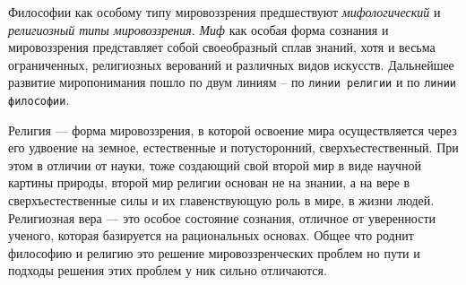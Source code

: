 \documentclass[12pt]{article}
\begin{document}
Философии как особому типу мировоззрения предшествуют \textit{мифологический} и \textit{религиозный типы мировоззрения}.
\textit{Миф} как особая форма сознания и мировоззрения представляет собой своеобразный сплав знаний, хотя и
весьма ограниченных, религиозных верований и различных видов искусств.
Дальнейшее развитие миропонимания пошло по двум линиям – по \texttt{линии религии} и по \texttt{линии философии}.

Религия --- форма мировоззрения, в которой освоение мира осуществляется через его удвоение на земное,
естественные и потусторонний, сверхъестественный. 
При этом в отличии от науки, тоже создающий свой второй мир в виде научной картины природы,
второй мир религии основан не на знании, а на вере в сверхъестественные силы и их главенствующую роль в мире,
в жизни людей. Религиозная вера --- это особое состояние сознания, отличное от уверенности ученого,
которая базируется на рациональных основах.
Общее что роднит философию и религию это решение мировоззренческих проблем но пути и подходы решения
этих проблем у ник сильно отличаются.
\end{document}
